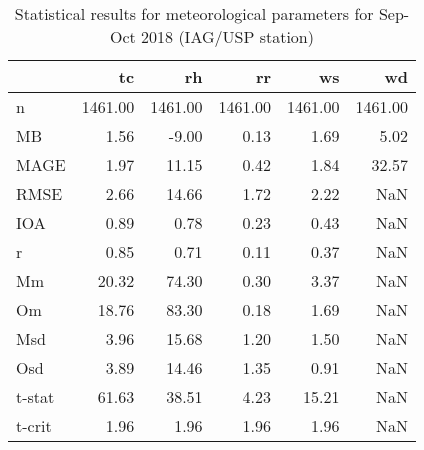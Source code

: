 \begin{table}
\centering
\caption{Statistical results for meteorological parameters for Sep-Oct 2018 (IAG/USP station)}
\label{tab:stats_iag}
\begin{tabular}{lrrrrr}
\toprule
{} &       tc &       rh &       rr &       ws &       wd \\
\midrule
n      &  1461.00 &  1461.00 &  1461.00 &  1461.00 &  1461.00 \\
MB     &     1.56 &    -9.00 &     0.13 &     1.69 &     5.02 \\
MAGE   &     1.97 &    11.15 &     0.42 &     1.84 &    32.57 \\
RMSE   &     2.66 &    14.66 &     1.72 &     2.22 &      NaN \\
IOA    &     0.89 &     0.78 &     0.23 &     0.43 &      NaN \\
r      &     0.85 &     0.71 &     0.11 &     0.37 &      NaN \\
Mm     &    20.32 &    74.30 &     0.30 &     3.37 &      NaN \\
Om     &    18.76 &    83.30 &     0.18 &     1.69 &      NaN \\
Msd    &     3.96 &    15.68 &     1.20 &     1.50 &      NaN \\
Osd    &     3.89 &    14.46 &     1.35 &     0.91 &      NaN \\
t-stat &    61.63 &    38.51 &     4.23 &    15.21 &      NaN \\
t-crit &     1.96 &     1.96 &     1.96 &     1.96 &      NaN \\
\bottomrule
\end{tabular}
\end{table}

